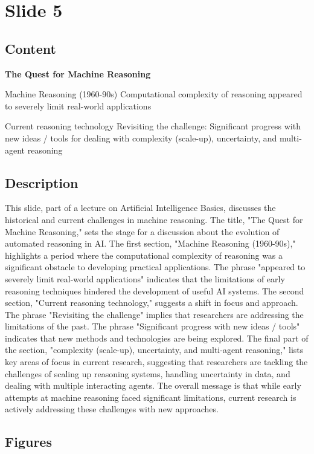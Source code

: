 \documentclass{article}%
\begin{document}
%
\newpage%
\section{Slide 5}%
\label{sec:Slide5}%
\subsection{Content}%

\textbf{The Quest for Machine Reasoning}

Machine Reasoning (1960-90s)
Computational complexity of reasoning
appeared to severely limit real-world
applications

Current reasoning technology
Revisiting the challenge: Significant progress
with new ideas / tools for dealing with
complexity (scale-up), uncertainty, and multi-
agent reasoning
%
\subsection{Description}%
This slide, part of a lecture on Artificial Intelligence Basics, discusses the historical and current challenges in machine reasoning.  The title, "The Quest for Machine Reasoning," sets the stage for a discussion about the evolution of automated reasoning in AI.  The first section, "Machine Reasoning (1960-90s)," highlights a period where the computational complexity of reasoning was a significant obstacle to developing practical applications.  The phrase "appeared to severely limit real-world applications" indicates that the limitations of early reasoning techniques hindered the development of useful AI systems.  The second section, "Current reasoning technology," suggests a shift in focus and approach.  The phrase "Revisiting the challenge" implies that researchers are addressing the limitations of the past.  The phrase "Significant progress with new ideas / tools" indicates that new methods and technologies are being explored.  The final part of the section, "complexity (scale-up), uncertainty, and multi-agent reasoning," lists key areas of focus in current research, suggesting that researchers are tackling the challenges of scaling up reasoning systems, handling uncertainty in data, and dealing with multiple interacting agents.  The overall message is that while early attempts at machine reasoning faced significant limitations, current research is actively addressing these challenges with new approaches.%
\subsection{Figures}%
\begin{figure}[H]%
\centering%
\end{figure}
\end{document}
